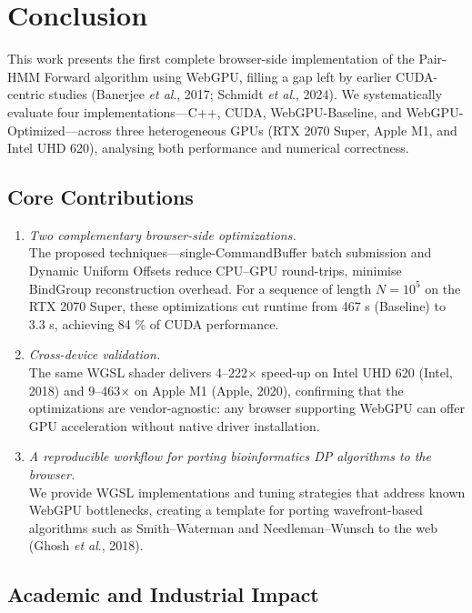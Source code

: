 \documentclass[PhD]{PHlab-thesis}
\begin{document}
\chapter{Conclusion}

This work presents the first complete browser-side implementation of the Pair-HMM Forward algorithm using WebGPU, filling a gap left by earlier CUDA-centric studies (Banerjee \emph{et al}., 2017; Schmidt \emph{et al}., 2024). We systematically evaluate four implementations—C++, CUDA, WebGPU-Baseline, and WebGPU-Optimized—across three heterogeneous GPUs (RTX 2070 Super, Apple M1, and Intel UHD 620), analysing both performance and numerical correctness.

\section{Core Contributions}

\begin{enumerate}
    \item \emph{Two complementary browser-side optimizations.} \\
    The proposed techniques—single-CommandBuffer batch submission and Dynamic Uniform Offsets reduce CPU–GPU round-trips, minimise BindGroup reconstruction overhead. For a sequence of length $N = 10^{5}$ on the RTX 2070 Super, these optimizations cut runtime from 467 s (Baseline) to 3.3 s, achieving 84 \% of CUDA performance.

    \item \emph{Cross-device validation.} \\
    The same WGSL shader delivers 4–222$\times$ speed-up on Intel UHD 620 (Intel, 2018) and 9–463$\times$ on Apple M1 (Apple, 2020), confirming that the optimizations are vendor-agnostic: any browser supporting WebGPU can offer GPU acceleration without native driver installation.

    \item \emph{A reproducible workflow for porting bioinformatics DP algorithms to the browser.} \\
    We provide WGSL implementations and tuning strategies that address known WebGPU bottlenecks, creating a template for porting wavefront-based algorithms such as Smith–Waterman and Needleman–Wunsch to the web (Ghosh \emph{et al}., 2018).
\end{enumerate}

\section{Academic and Industrial Impact}
\end{document}
